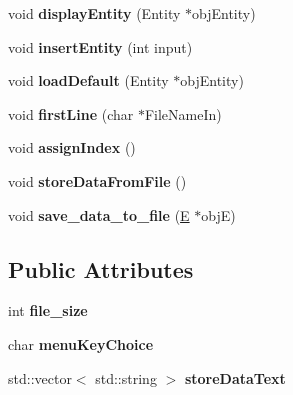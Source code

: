 \begin{DoxyCompactItemize}
\item 
void {\bfseries display\+Entity} (Entity $\ast$obj\+Entity)\hypertarget{classdataFile_a27424d99280d1d2768b1d9159dc5dc3f}{}\label{classdataFile_a27424d99280d1d2768b1d9159dc5dc3f}

\item 
void {\bfseries insert\+Entity} (int input)\hypertarget{classdataFile_aae8e00d06e7f77279e4fe3b9423326eb}{}\label{classdataFile_aae8e00d06e7f77279e4fe3b9423326eb}

\item 
void {\bfseries load\+Default} (Entity $\ast$obj\+Entity)\hypertarget{classdataFile_ac2bb950ec17ee6aa3219314b24b41f15}{}\label{classdataFile_ac2bb950ec17ee6aa3219314b24b41f15}

\item 
void {\bfseries first\+Line} (char $\ast$File\+Name\+In)\hypertarget{classdataFile_a246473de0774bd774b926839d40ac862}{}\label{classdataFile_a246473de0774bd774b926839d40ac862}

\item 
void {\bfseries assign\+Index} ()\hypertarget{classdataFile_a9500ccb6ed2c8957e492d03035305779}{}\label{classdataFile_a9500ccb6ed2c8957e492d03035305779}

\item 
void {\bfseries store\+Data\+From\+File} ()\hypertarget{classdataFile_aeb57dc23f63bdbe4324e84927650f19f}{}\label{classdataFile_aeb57dc23f63bdbe4324e84927650f19f}

\item 
void {\bfseries save\+\_\+data\+\_\+to\+\_\+file} (\hyperlink{classE}{E} $\ast$objE)\hypertarget{classdataFile_a392b3a6da0fbbe3f8318c87d124ad7db}{}\label{classdataFile_a392b3a6da0fbbe3f8318c87d124ad7db}

\end{DoxyCompactItemize}
\subsection*{Public Attributes}
\begin{DoxyCompactItemize}
\item 
int {\bfseries file\+\_\+size}\hypertarget{classdataFile_a1c87c4ffe2e0f92336d285e689321bcc}{}\label{classdataFile_a1c87c4ffe2e0f92336d285e689321bcc}

\item 
char {\bfseries menu\+Key\+Choice}\hypertarget{classdataFile_acc264e07f3b18113d83025050f4a6fc4}{}\label{classdataFile_acc264e07f3b18113d83025050f4a6fc4}

\item 
std\+::vector$<$ std\+::string $>$ {\bfseries store\+Data\+Text}\hypertarget{classdataFile_a05d60d8692c453160c661ccdaaaf8dfc}{}\label{classdataFile_a05d60d8692c453160c661ccdaaaf8dfc}

\end{DoxyCompactItemize}
